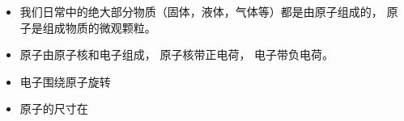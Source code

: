 
\begin{issues}
\issueDraft
\end{issues}

\begin{itemize}
\item 我们日常中的绝大部分物质（固体，液体，气体等）都是由原子组成的， 原子是组成物质的微观颗粒。
\item 原子由原子核和电子组成， 原子核带正电荷， 电子带负电荷。
\item 电子围绕原子旋转
\item 原子的尺寸在
\end{itemize}
